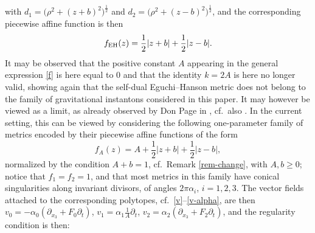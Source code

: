 \documentclass[pdftex]{sigma}
\numberwithin{equation}{section}
\begin{document}
with $d _1 = \big(\rho ^2 + (z + b) ^2\big)^{\frac{1}{2}}$ and $d_2 = \big(\rho ^2 + (z - b) ^2\big)^{\frac{1}{2}}$, and the corresponding piecewise affine function is then
\[ f_{\rm EH} (z) = \frac{1}{2} |z + b| + \frac{1}{2} |z - b|. \]
It may be observed that the positive constant $A$ appearing in the general expression \eqref{f} is here equal to $0$ and that the identity $k = 2 A$ is here no longer valid, showing again that the self-dual Eguchi--Hanson metric does not belong to the family of gravitational instantons considered in this paper. It may however be viewed as a limit, as already observed by Don Page in \cite{P}, cf.~also \cite[Section~7.2]{BG}.
In the current setting, this can be viewed by considering the following one-parameter family of metrics encoded by their piecewise affine functions of the form
\[ f _A (z) = A + \frac{1}{2} |z + b| + \frac{1}{2} |z - b|, \]
 normalized by the condition $A + b = 1$, cf.\ Remark \ref{rem-change}, with $A, b \geq 0$; notice that $f_1 = f _2 = 1$, and that most metrics in this family have conical singularities along invariant divisors, of angles $2 \pi \alpha _i$, $i = 1, 2, 3$. The vector fields attached to the corresponding polytopes, cf.\ \eqref{v}--\eqref{v-alpha}, are then $v_0 = - \alpha _0 (\partial _{x_3} + F _0 \partial _t)$, $v _1 = \alpha _1 \frac{1}{A} \partial _t$, $v _2 = \alpha _2 (\partial _{x_3} + F _2 \partial _t)$, and the regularity condition is then:
\end{document}
